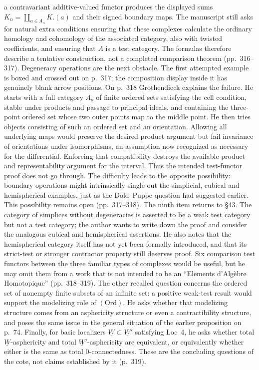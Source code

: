 \documentclass[10pt,oneside]{book}
\begin{document}
a contravariant additive-valued functor produces the displayed sums $K_n=\coprod_{a\in A_n}K.(a)$ and their signed boundary maps. The manuscript still asks for natural extra conditions ensuring that these complexes calculate the ordinary homology and cohomology of the associated category, also with twisted coefficients, and ensuring that $A$ is a test category. The formulas therefore describe a tentative construction, not a completed comparison theorem (pp.\ 316--317). Degeneracy operations are the next obstacle. The first attempted example is boxed and crossed out on p.\ 317; the composition display inside it has genuinely blank arrow positions. On p.\ 318 Grothendieck explains the failure. He starts with a full category $A_o$ of finite ordered sets satisfying the cell condition, stable under products and passage to principal ideals, and containing the three-point ordered set whose two outer points map to the middle point. He then tries objects consisting of such an ordered set and an orientation. Allowing all underlying maps would preserve the desired product argument but fail invariance of orientations under isomorphisms, an assumption now recognized as necessary for the differential. Enforcing that compatibility destroys the available product and representability argument for the interval. Thus the intended test-functor proof does not go through. The difficulty leads to the opposite possibility: boundary operations might intrinsically single out the simplicial, cubical and hemispherical examples, just as the Dold--Puppe question had suggested earlier. This possibility remains open (pp.\ 317--318). The ninth item returns to \S43. The category of simplices without degeneracies is asserted to be a weak test category but not a test category; the author wants to write down the proof and consider the analogous cubical and hemispherical assertions. He also notes that the hemispherical category itself has not yet been formally introduced, and that its strict-test or stronger contractor property still deserves proof. Six comparison test functors between the three familiar types of complexes would be useful, but he may omit them from a work that is not intended to be an “Elements d'Algèbre Homotopique” (pp.\ 318--319). The other recalled question concerns the ordered set of nonempty finite subsets of an infinite set: a positive weak-test result would support the modelizing role of $(\mathrm{Ord})$. He asks whether that modelizing structure comes from an asphericity structure or even a contractibility structure, and poses the same issue in the general situation of the earlier proposition on p.\ 74. Finally, for basic localizers $\underline W\subset\underline W'$ satisfying Loc~4, he asks whether total $\underline W$-asphericity and total $\underline W'$-asphericity are equivalent, or equivalently whether either is the same as total 0-connectedness. These are the concluding questions of the cote, not claims established by it (p.\ 319).
\end{document}
